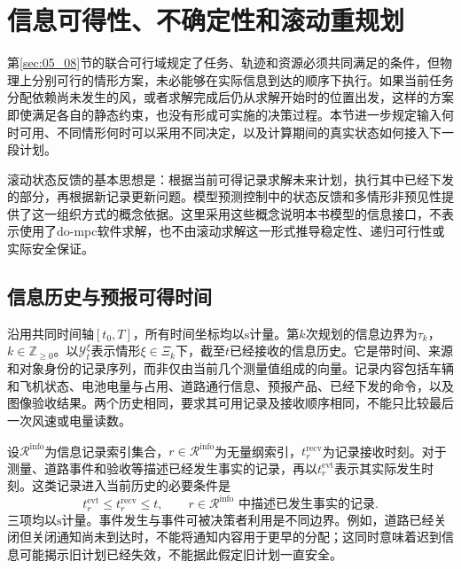 \section{信息可得性、不确定性和滚动重规划}
\label{sec:05_09}

第\ref{sec:05_08}节的联合可行域规定了任务、轨迹和资源必须共同满足的条件，但物理上分别可行的情形方案，未必能够在实际信息到达的顺序下执行。如果当前任务分配依赖尚未发生的风，或者求解完成后仍从求解开始时的位置出发，这样的方案即使满足各自的静态约束，也没有形成可实施的决策过程。本节进一步规定输入何时可用、不同情形何时可以采用不同决定，以及计算期间的真实状态如何接入下一段计划。

滚动状态反馈的基本思想是：根据当前可得记录求解未来计划，执行其中已经下发的部分，再根据新记录更新问题。模型预测控制中的状态反馈和多情形非预见性提供了这一组织方式的概念依据\cite{DoMPC}。这里采用这些概念说明本书模型的信息接口，不表示使用了do-mpc软件求解，也不由滚动求解这一形式推导稳定性、递归可行性或实际安全保证。

\subsection{信息历史与预报可得时间}

沿用共同时间轴$[t_0,T]$，所有时间坐标均以$\mathrm s$计量。第$k$次规划的信息边界为$\tau_k$，$k\in\mathbb Z_{\ge0}$。以$\mathcal Y_t^\xi$表示情形$\xi\in\Xi_k$下，截至$t$已经接收的信息历史。它是带时间、来源和对象身份的记录序列，而非仅由当前几个测量值组成的向量。记录内容包括车辆和飞机状态、电池电量与占用、道路通行信息、预报产品、已经下发的命令，以及图像验收结果。两个历史相同，要求其可用记录及接收顺序相同，不能只比较最后一次风速或电量读数。

设$\mathcal R^{\mathrm{info}}$为信息记录索引集合，$r\in\mathcal R^{\mathrm{info}}$为无量纲索引，$t_r^{\mathrm{recv}}$为记录接收时刻。对于测量、道路事件和验收等描述已经发生事实的记录，再以$t_r^{\mathrm{evt}}$表示其实际发生时刻。这类记录进入当前历史的必要条件是
\begin{equation}
 t_r^{\mathrm{evt}}\le t_r^{\mathrm{recv}}\le t,
 \qquad r\in\mathcal R^{\mathrm{info}}
 \text{ 中描述已发生事实的记录}.
 \label{s0509:received_event}
\end{equation}
三项均以$\mathrm s$计量。事件发生与事件可被决策者利用是不同边界。例如，道路已经关闭但关闭通知尚未到达时，不能将通知内容用于更早的分配；这同时意味着迟到信息可能揭示旧计划已经失效，不能据此假定旧计划一直安全。

